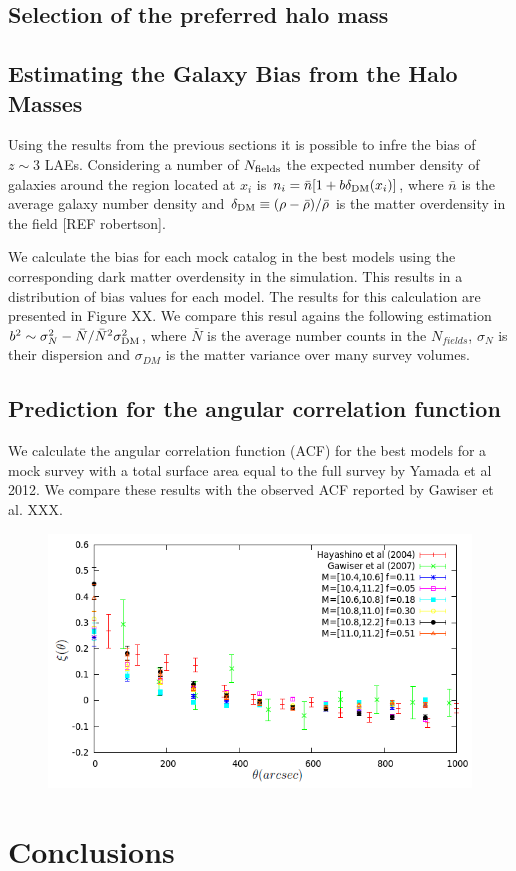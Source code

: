 \documentclass{emulateapj}
\begin{document}
\subsection{Selection of the preferred halo mass}




\subsection{Estimating the Galaxy Bias from the Halo Masses}
Using the results from the previous sections it is possible to infre the bias of $z\sim 3$ LAEs. Considering a number of $N_{\rm fields}$ the expected number density of galaxies around the region located at $x_{i}$ is $n_{i}=\bar{n}[1+ b\delta_{\rm DM}(x_{i})]$, where $\bar{n}$ is the average galaxy number density and $\delta_{\rm DM}\equiv (\rho - \bar{\rho})/\bar{\rho}$ is the matter overdensity in the field [REF robertson].

We calculate the bias for each mock catalog in the best models using the corresponding dark matter overdensity in the simulation. This results in a distribution of bias values for each model. The results for this calculation are presented in Figure XX.  We compare this resul agains the following estimation $b^{2}\sim {\sigma_{N}^{2} - \bar{N}}/\bar{N}^{2}\sigma_{\rm DM}^{2}$, where $\bar{N}$ is the average number counts in the $N_{fields}$, $\sigma_{N}$ is their dispersion and $\sigma_{DM}$ is the matter variance over many survey volumes.

\subsection{Prediction for the angular correlation function}

We calculate the angular correlation function (ACF) for the best models for a mock survey with a total surface area equal to the full survey by Yamada et al 2012. We compare these results with the observed ACF reported by Gawiser et al. XXX. 

\begin{figure}
\begin{center}
\includegraphics[width=1.00\linewidth,angle=0]{./plots/correlation_best_models_with_obs_comp.png}
\end{center} 
\caption{ \label{figure:landscape} 
}
\end{figure}

% 

\section{Conclusions}
\end{document}

